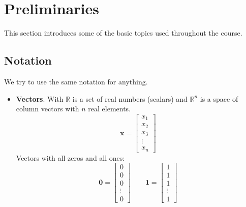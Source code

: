 \section{Preliminaries}

This section introduces some of the basic topics used throughout the course.

\subsection{Notation}

We try to use the same notation for anything.
\begin{itemize}
	\item \textbf{Vectors}. With $\mathbb{R}$ is a set of real numbers (scalars) and $\mathbb{R}^{n}$ is a space of column vectors with $n$ real elements.
	\begin{equation*}
		\mathbf{x} = \begin{bmatrix}
			x_{1} \\ x_{2} \\ x_{3} \\ \vdots \\ x_{n}
		\end{bmatrix}
	\end{equation*}
	Vectors with all zeros and all ones:
	\begin{equation*}
		\mathbf{0} = \begin{bmatrix}
			0 \\ 0 \\ 0 \\ \vdots \\ 0
		\end{bmatrix}
		\hspace{2em}
		\mathbf{1} = \begin{bmatrix}
			1 \\ 1 \\ 1 \\ \vdots \\ 1
		\end{bmatrix}
	\end{equation*}
	

\end{itemize}
